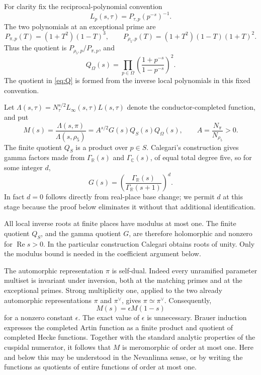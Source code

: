 \documentclass[11pt]{article}
\theoremstyle{definition}
\theoremstyle{remark}
\newcommand{\R}{\mathbb R}
\newcommand{\C}{\mathbb C}
\newcommand{\Gr}{\Gamma_{\R}}
\newcommand{\Gc}{\Gamma_{\C}}
\newcommand{\rh}{\rho_5}
\newcommand{\Rea}{\operatorname{Re}}
\numberwithin{equation}{section}
\begin{document}
For clarity fix the reciprocal-polynomial convention
\[
L_p(s,\tau)=P_{\tau,p}(p^{-s})^{-1}.
\]
The two polynomials at an exceptional prime are
\[
P_{\pi,p}(T)=(1+T^2)(1-T)^3,
\qquad P_{\rh,p}(T)=(1+T^2)(1-T)(1+T)^2.
\]
Thus the quotient is $P_{\rh,p}/P_{\pi,p}$, and
\begin{equation}\label{eq:Q}
Q_\Omega(s)=\prod_{p\in\Omega}
\left(\frac{1+p^{-s}}{1-p^{-s}}\right)^2.
\end{equation}
The quotient in \eqref{eq:Q} is formed from the inverse local polynomials in this fixed convention.

Let $\Lambda(s,\tau)=N_\tau^{s/2}L_\infty(s,\tau)L(s,\tau)$ denote the conductor-completed function, and put
\begin{equation}\label{eq:M}
M(s)=\frac{\Lambda(s,\pi)}{\Lambda(s,\rh)}
=A^{s/2}G(s)Q_S(s)Q_\Omega(s),
\qquad A=\frac{N_\pi}{N_{\rh}}>0.
\end{equation}
The finite quotient $Q_S$ is a product over $p\in S$. Calegari's construction gives gamma factors made from $\Gr(s)$ and $\Gc(s)$, of equal total degree five, so for some integer $d$,
\begin{equation}\label{eq:G}
G(s)=\left(\frac{\Gr(s)}{\Gr(s+1)}\right)^d.
\end{equation}
In fact $d=0$ follows directly from real-place base change; we permit $d$ at this stage because the proof below eliminates it without that additional identification.

All local inverse roots at finite places have modulus at most one. The finite quotient $Q_S$, and the gamma quotient $G$, are therefore holomorphic and nonzero for $\Rea s>0$. In the particular construction Calegari obtains roots of unity. Only the modulus bound is needed in the coefficient argument below.

The automorphic representation $\pi$ is self-dual. Indeed every unramified parameter multiset is invariant under inversion, both at the matching primes and at the exceptional primes. Strong multiplicity one, applied to the two already automorphic representations $\pi$ and $\pi^\vee$, gives $\pi\simeq\pi^\vee$. Consequently,
\begin{equation}\label{eq:FE}
M(s)=\epsilon M(1-s)
\end{equation}
for a nonzero constant $\epsilon$. The exact value of $\epsilon$ is unnecessary. Brauer induction expresses the completed Artin function as a finite product and quotient of completed Hecke functions. Together with the standard analytic properties of the cuspidal numerator, it follows that $M$ is meromorphic of order at most one. Here and below this may be understood in the Nevanlinna sense, or by writing the functions as quotients of entire functions of order at most one.
\end{document}
